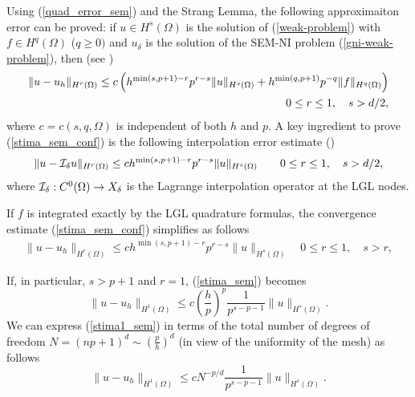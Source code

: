 \documentclass[11pt]{article}
\begin{document}
Using (\ref{quad_error_sem}) and the Strang Lemma, the following 
approximaiton error can be proved:
if $u\in H^s(\Omega)$ is the solution of (\ref{weak-problem}) with 
$f\in H^q(\Omega)$ ($q\geq 0)$
and $u_\delta$ is the solution of the SEM-NI problem (\ref{gni-weak-problem}),
then (see \cite{bm,chqz06,chqz07})
\begin{eqnarray}\label{stima_sem_conf}
\|u-u_h\|_{H^r(\Omega)}\leq 
c \left(h^{\min(s,p+1)-r}p^{r-s} \|u\|_{H^s(\Omega)}
+h^{\min(q,p+1)}p^{-q} \|f\|_{H^q(\Omega)}\right)\\
\nonumber
\hfill{ 0\leq r \leq 1,\quad s>d/2,}
\end{eqnarray}
where $c=c(s,q,\Omega)$ is independent of both $h$ and $p$.
A key ingredient to prove  (\ref{stima_sem_conf}) is
 the following interpolation error estimate
(\cite{bm,chqz06,chqz07}) 
\begin{eqnarray}\label{stima_sem_interp}
\|u-{\cal I}_\delta u\|_{H^r(\Omega)}\leq 
c h^{\min(s,p+1)-r}p^{r-s} \|u\|_{H^s(\Omega)}
\qquad  0\leq r \leq 1,\quad s>d/2,
\end{eqnarray}
where ${\cal I}_\delta:C^0(\Omega)\to X_\delta$ 
is the Lagrange interpolation operator at the LGL nodes. 


If $f$ is integrated exactly by the LGL quadrature formulas,
the convergence estimate (\ref{stima_sem_conf}) simplifies as follows
\begin{eqnarray}\label{stima_sem}
\|u-u_h\|_{H^r(\Omega)}\leq 
c h^{\min(s,p+1)-r}p^{r-s} \|u\|_{H^s(\Omega)}
\quad  0\leq r \leq 1,\quad s>r, 
\end{eqnarray}

If, in particular, $s>p+1$ and $r=1$,
(\ref{stima_sem}) becomes 
\begin{equation}\label{stima1_sem}
\|u-u_h\|_{H^1(\Omega)}\leq c \left(\frac{h}{p}\right)^p \frac{1}{p^{s-p-1}} \|u\|_{H^s(\Omega)}.
\end{equation}
We can express (\ref{stima1_sem}) in terms of the total number of
degrees of freedom 
$N=(n p+1)^d
\sim \left(\frac{p}{h}\right)^d$ (in view of the uniformity of the mesh)
as follows
\begin{equation}\label{stima2_sem}
\|u-u_h\|_{H^1(\Omega)}\leq c N^{-p/d} \frac{1}{p^{s-p-1}} \|u\|_{H^s(\Omega)}.
\end{equation}
\end{document}
